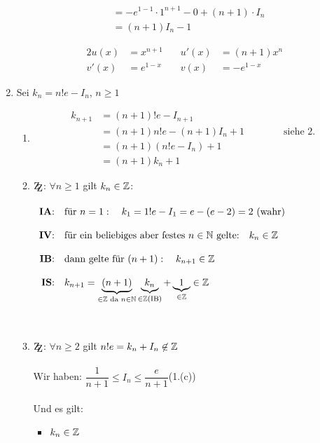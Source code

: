 \begin{Beweis}
\begin{enumerate}
\begin{minipage}{0.55\textwidth}
\begin{align*}
&=-e^{1-1}\cdot 1^{n+1}-0+(n+1)\cdot I_n\\
&=(n+1)I_n-1
\end{align*}
\end{minipage}
\begin{minipage}{0.45\textwidth}
\begin{alignat*}{2}
u(x)&=x^{n+1}\quad& u\prime(x)&=(n+1)x^n\\
v'(x)&=e^{1-x}\quad & v(x)&=-e^{1-x}
\end{alignat*}
\end{minipage}
\newpage
\item Sei $k_n=n!e-I_n$, $n\geq1$
\begin{enumerate}
\item
\begin{align*}
k_{n+1}&=(n+1)!e-I_{n+1}\\
&=(n+1)n!e-(n+1)I_n+1\qquad\qquad\mbox{siehe 2.}\\
&=(n+1)(n!e-I_n)+1\\
&=(n+1)k_n+1
\end{align*}
\item $\zz$: $\forall n\geq1$ gilt $k_n\in\mathbb{Z}$:\\\\
$\begin{array}{rl}
\mbox{\textbf{IA}:} & \mbox{für }n=1:\quad k_1=1!e-I_1=e-(e-2)=2 \mbox{ (wahr)} \\\\
\mbox{\textbf{IV}:} & \mbox{für ein beliebiges aber festes }n\in\mathbb{N} \mbox{ gelte:}\quad k_n\in\mathbb{Z}\\\\
\mbox{\textbf{IB}:} & \mbox{dann gelte für }(n+1):\quad k_{n+1}\in\mathbb{Z}\\\\
\mbox{\textbf{IS}:} & k_{n+1}=\underbrace{(n+1)}_{\in\mathbb{Z}\text{ da }n\in\mathbb{N}}\underbrace{k_n}_{\in\mathbb{Z}\text{(IB)}}+\underbrace{1}_{\in\mathbb{Z}}\in\mathbb{Z}\\\\
\end{array}$
\\\\
\item $\zz$: $\forall n\geq 2$ gilt $n!e=k_n+I_n\not\in\mathbb{Z}$\\\\
Wir haben: $\dfrac{1}{n+1}\leq I_n \leq  \dfrac{e}{n+1}$\quad(1.(c))\\\\
Und es gilt: \begin{itemize}\item$k_n\in\mathbb{Z}$

\end{itemize}
\end{enumerate}
\end{enumerate}
\end{Beweis}
